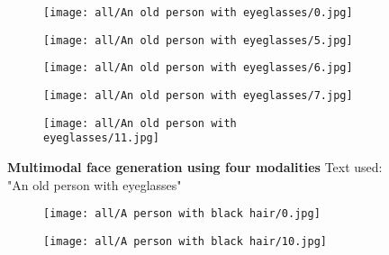 \documentclass[10pt,twocolumn,letterpaper]{article}
\begin{document}
 \begin{figure*}[t!]
    \centering
    \begin{subfigure}[t]{\linewidth}
      \captionsetup{justification=centering, labelformat=empty, font=scriptsize}
\texttt{[image: all/An old person with eyeglasses/0.jpg]}

    \end{subfigure}
       \begin{subfigure}[t]{\linewidth}
      \captionsetup{justification=centering, labelformat=empty, font=scriptsize}
  \texttt{[image: all/An old person with eyeglasses/5.jpg]}

    \end{subfigure}
      \begin{subfigure}[t]{\linewidth}
      \captionsetup{justification=centering, labelformat=empty, font=scriptsize}
  \texttt{[image: all/An old person with eyeglasses/6.jpg]}

    \end{subfigure}
     \begin{subfigure}[t]{\linewidth}
      \captionsetup{justification=centering, labelformat=empty, font=scriptsize}
  \texttt{[image: all/An old person with eyeglasses/7.jpg]}

    \end{subfigure}
\begin{subfigure}[t]{\linewidth}
      \captionsetup{justification=centering, labelformat=empty, font=scriptsize}
  \texttt{[image: all/An old person with eyeglasses/11.jpg]}

    \end{subfigure}

    \vspace{-3mm}    \caption{\textbf{Multimodal face generation using four modalities} Text used: "An old person with  eyeglasses" }
    \label{fig:facesematicsupp3}
  \end{figure*} \begin{figure*}[t!]
    \centering
    \begin{subfigure}[t]{\linewidth}
      \captionsetup{justification=centering, labelformat=empty, font=scriptsize}
\texttt{[image: all/A person with black hair/0.jpg]}

    \end{subfigure}
       \begin{subfigure}[t]{\linewidth}
      \captionsetup{justification=centering, labelformat=empty, font=scriptsize}
  \texttt{[image: all/A person with black hair/10.jpg]}


\end{subfigure}
\end{figure*}
\end{document}
